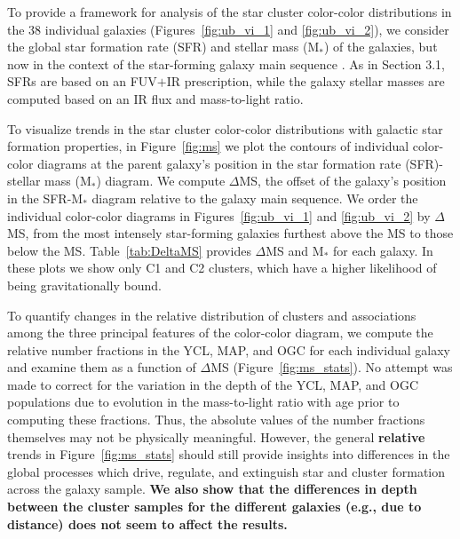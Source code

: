 \documentclass[linenumbers]{aastex63}
\begin{document}
To provide a framework for analysis of the star cluster color-color distributions in the 38 individual galaxies (Figures~\ref{fig:ub_vi_1} and \ref{fig:ub_vi_2}), we consider the global star formation rate (SFR) and stellar mass (M$_*$) of the galaxies, but now in the context of the star-forming galaxy main sequence \citep[e.g.,][]{salim_uv_2007, noeske_star_2007, lee_star_2007,peng_mass_2010}.  As in Section 3.1, SFRs are based on an FUV$+$IR prescription, while the galaxy stellar masses are computed based on an IR flux and mass-to-light ratio.

To visualize trends in the star cluster color-color distributions with galactic star formation properties, in  Figure~\ref{fig:ms} we plot the contours of individual color-color diagrams at the parent galaxy’s position in the star formation rate (SFR)-stellar mass (M$_*$) diagram.  We compute $\Delta$MS, the offset of the galaxy's position in the SFR-M$_*$ diagram relative to the galaxy main sequence.   We order the individual color-color diagrams in Figures~\ref{fig:ub_vi_1} and \ref{fig:ub_vi_2} by $\Delta$MS, from the most intensely star-forming galaxies furthest above the MS to those below the MS.  Table~\ref{tab:DeltaMS} provides $\Delta$MS and M$_*$ for each galaxy.  In these plots we show only C1 and C2 clusters, which have a higher likelihood of being gravitationally bound.  

To quantify changes in the relative distribution of clusters and associations among the three principal features of the color-color diagram, we compute the relative number fractions in the YCL, MAP, and OGC for each individual galaxy and examine them as a function of $\Delta$MS (Figure~\ref{fig:ms_stats}). No attempt was made to correct for the variation in the depth of the YCL, MAP, and OGC populations due to evolution in the mass-to-light ratio with age prior to computing these fractions.  Thus, the absolute values of the number fractions themselves may not be physically meaningful.  However, the general 
\textbf{relative} trends in Figure~\ref{fig:ms_stats} should still provide insights into differences in the global processes which drive, regulate, and extinguish star and cluster formation across the galaxy sample.  \textbf{We also show that the differences in depth between the cluster samples for the different galaxies (e.g., due to distance) does not seem to affect the results.}
 
\end{document}
